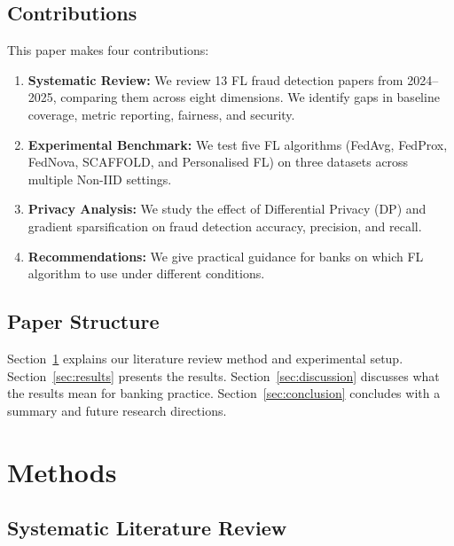 \documentclass[12pt, a4paper]{article}
\begin{document}
\subsection{Contributions}

This paper makes four contributions:

\begin{enumerate}[leftmargin=*, label=\arabic*.]
\item \textbf{Systematic Review:} We review 13 FL fraud detection papers from 2024--2025, comparing them across eight dimensions. We identify gaps in baseline coverage, metric reporting, fairness, and security.

\item \textbf{Experimental Benchmark:} We test five FL algorithms (FedAvg, FedProx, FedNova, SCAFFOLD, and Personalised FL) on three datasets across multiple Non-IID settings.

\item \textbf{Privacy Analysis:} We study the effect of Differential Privacy (DP) and gradient sparsification on fraud detection accuracy, precision, and recall.

\item \textbf{Recommendations:} We give practical guidance for banks on which FL algorithm to use under different conditions.
\end{enumerate}

\subsection{Paper Structure}

Section~\ref{sec:methods} explains our literature review method and experimental setup. Section~\ref{sec:results} presents the results. Section~\ref{sec:discussion} discusses what the results mean for banking practice. Section~\ref{sec:conclusion} concludes with a summary and future research directions.

\section{Methods}
\label{sec:methods}

\subsection{Systematic Literature Review}
\end{document}

